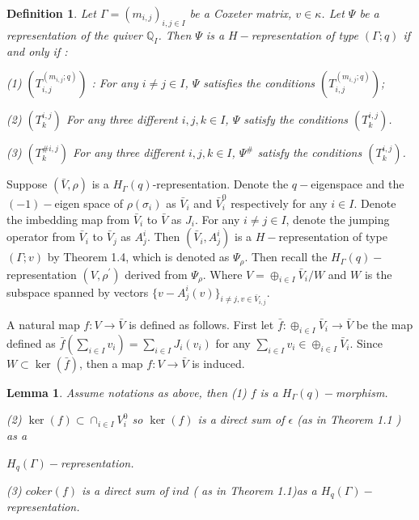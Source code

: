 \def\CTEXPreproc{Created by ctex v0.2.12, don't edit!}\documentclass[11pt]{article}
\newtheorem{lem}{Lemma}[section]
\newtheorem{defi}{Definition}[section]
\begin{document}
    \begin{defi}
    Let $\Gamma = ( m_{i,j} )_{i,j\in I}$ be a Coxeter matrix, $v\in \kappa$.  Let $\Psi$ be a representation of the quiver $\mathbb{Q}_{I}$. Then $\Psi$ is a $H-$representation of type $(\Gamma ; q )$ if and only if :

    (1) $(T^{(m_{i,j};q)}_{i,j})$ : For any $i\neq j\in I$, $\Psi$ satisfies the conditions $(T^{(m_{i,j};q)}_{i,j})$;

    (2) $(T^{i,j}_k)$  For any three different $i,j,k\in I$,  $\Psi$ satisfy the conditions $(  T^{i,j} _k )$.

    (3) $( T^{\# i,j} _k) $   For any three different $i,j,k\in I$,  $\Psi^{\#}$ satisfy the conditions $(  T^{i,j} _k )$.


    \end{defi}

    Suppose $(\bar{V},\rho)$ is a $H_{\Gamma}(q)$-representation. Denote the $q-$eigenspace and the $(-1)-$eigen
    space of $\rho(\sigma_i)$ as $\bar{V}_i$ and $\bar{V}^0 _i$ respectively for any $i\in I$. Denote the imbedding map from $\bar{V}_i$ to $\bar{V}$ as $ J_i$.
     For any $i\neq j\in I$, denote the jumping operator from $\bar{V}_i$ to
    $\bar{V}_j$ as $A^i _j$. Then $(\bar{V}_i , A^i _j )$ is a $H-$representation of type $(\Gamma ;v)$ by Theorem 1.4, which is denoted as $\Psi_{\rho}$.  Then recall the $H_{\Gamma}(q)-$representation  $(V,  \rho^{'} )$ derived from $\Psi_{\rho}$. Where
    $V= \oplus_{i\in I} \bar{V}_i /W $ and $W$ is the subspace spanned by vectors $\{ v-A^i _j (v)  \}_{i\neq j, v\in \bar{V}_{i,j}  }$.

    A natural map $f : V\rightarrow \bar{V}$ is defined as follows. First let $ \bar{f} : \oplus_{i\in I} \bar{V}_i \rightarrow \bar{V}$ be the map defined as $ \bar{f}( \sum_{i\in I} v_i  ) = \sum_{i\in I} J_i ( v_i )$ for any $\sum_{i\in I} v_i \in  \oplus_{i\in I} \bar{V}_i$.  Since $W\subset \ker(\bar{f})$, then a map $f: V\rightarrow \bar{V}$ is induced.

    \begin{lem} Assume notations as above, then
     (1) $f$ is a $H_{\Gamma}(q)-$morphism.

     \noindent(2) $\ker(f) \subset \cap_{i\in I} V^0 _i $ so $\ker(f)$ is a direct sum of $\epsilon$ (as in Theorem 1.1 ) as a

     $H_{q}(\Gamma)-$representation.

    \noindent (3) $coker(f)$ is a direct sum of $ind$ ( as in Theorem 1.1)as a $H_{q}(\Gamma)-$representation.

    \end{lem}
\end{document}
